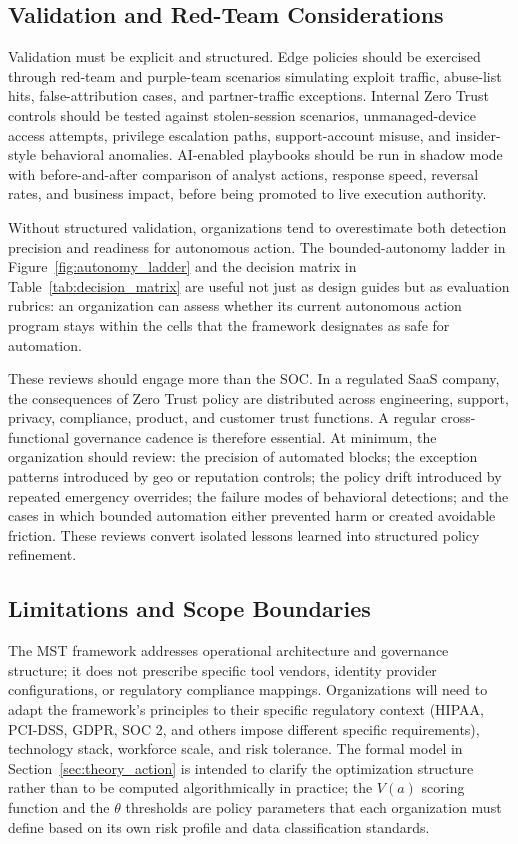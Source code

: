 \documentclass[acmlarge]{acmart}
\begin{document}
\subsection{Validation and Red-Team Considerations}

Validation must be explicit and structured. Edge policies should be exercised through
red-team and purple-team scenarios simulating exploit traffic, abuse-list hits,
false-attribution cases, and partner-traffic exceptions. Internal Zero Trust controls
should be tested against stolen-session scenarios, unmanaged-device access attempts,
privilege escalation paths, support-account misuse, and insider-style behavioral anomalies.
AI-enabled playbooks should be run in shadow mode with before-and-after comparison of
analyst actions, response speed, reversal rates, and business impact, before being
promoted to live execution authority.

Without structured validation, organizations tend to overestimate both detection precision
and readiness for autonomous action. The bounded-autonomy ladder in Figure~\ref{fig:autonomy_ladder}
and the decision matrix in Table~\ref{tab:decision_matrix} are useful not just as design
guides but as evaluation rubrics: an organization can assess whether its current autonomous
action program stays within the cells that the framework designates as safe for automation.

These reviews should engage more than the SOC. In a regulated SaaS company, the consequences
of Zero Trust policy are distributed across engineering, support, privacy, compliance,
product, and customer trust functions. A regular cross-functional governance cadence is
therefore essential. At minimum, the organization should review: the precision of automated
blocks; the exception patterns introduced by geo or reputation controls; the policy drift
introduced by repeated emergency overrides; the failure modes of behavioral detections; and
the cases in which bounded automation either prevented harm or created avoidable friction.
These reviews convert isolated lessons learned into structured policy refinement.

\subsection{Limitations and Scope Boundaries}

The MST framework addresses operational architecture and governance structure; it does not
prescribe specific tool vendors, identity provider configurations, or regulatory compliance
mappings. Organizations will need to adapt the framework's principles to their specific
regulatory context (HIPAA, PCI-DSS, GDPR, SOC 2, and others impose different specific
requirements), technology stack, workforce scale, and risk tolerance. The formal model in
Section~\ref{sec:theory_action} is intended to clarify the optimization structure rather than to be computed
algorithmically in practice; the $V(a)$ scoring function and the $\theta$ thresholds are
policy parameters that each organization must define based on its own risk profile and
data classification standards.
\end{document}
